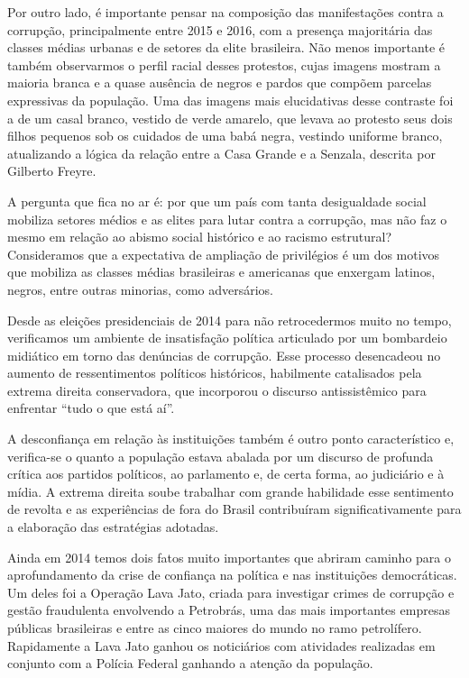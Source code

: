Por outro lado, é importante pensar na composição das manifestações
contra a corrupção, principalmente entre 2015 e 2016, com a presença
majoritária das classes médias urbanas e de setores da elite brasileira.
Não menos importante é também observarmos o perfil racial desses
protestos, cujas imagens mostram a maioria branca e a quase ausência de
negros e pardos que compõem parcelas expressivas da população. Uma das
imagens mais elucidativas desse contraste foi a de um casal branco,
vestido de verde amarelo, que levava ao protesto seus dois filhos
pequenos sob os cuidados de uma babá negra, vestindo uniforme branco,
atualizando a lógica da relação entre a Casa Grande e a Senzala,
descrita por Gilberto Freyre.

A pergunta que fica no ar é: por que um país com tanta desigualdade
social mobiliza setores médios e as elites para lutar contra a
corrupção, mas não faz o mesmo em relação ao abismo social histórico e
ao racismo estrutural? Consideramos que a expectativa de ampliação de
privilégios é um dos motivos que mobiliza as classes médias brasileiras
e americanas que enxergam latinos, negros, entre outras minorias, como
adversários.

Desde as eleições presidenciais de 2014 para não retrocedermos muito no
tempo, verificamos um ambiente de insatisfação política articulado por
um bombardeio midiático em torno das denúncias de corrupção. Esse
processo desencadeou no aumento de ressentimentos políticos históricos,
habilmente catalisados pela extrema direita conservadora, que incorporou
o discurso antissistêmico para enfrentar ``tudo o que está aí''.

A desconfiança em relação às instituições também é outro ponto
característico e, verifica-se o quanto a população estava abalada por um
discurso de profunda crítica aos partidos políticos, ao parlamento e, de
certa forma, ao judiciário e à mídia. A extrema direita soube trabalhar
com grande habilidade esse sentimento de revolta e as experiências de
fora do Brasil contribuíram significativamente para a elaboração das
estratégias adotadas.

Ainda em 2014 temos dois fatos muito importantes que abriram caminho
para o aprofundamento da crise de confiança na política e nas
instituições democráticas. Um deles foi a Operação Lava Jato, criada
para investigar crimes de corrupção e gestão fraudulenta envolvendo a
Petrobrás, uma das mais importantes empresas públicas brasileiras e
entre as cinco maiores do mundo no ramo petrolífero. Rapidamente a Lava
Jato ganhou os noticiários com atividades realizadas em conjunto com a
Polícia Federal ganhando a atenção da população.

